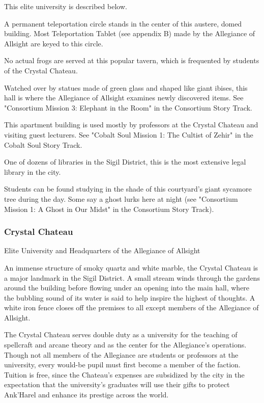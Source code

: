 \documentclass[10pt,a4paper,twoside,bg=print,twocolumn,openany,nodeprecatedcode]{dndbook}
\begin{document}
\begin{description}[nolistsep]
\item[S1: Crystal Chateau Entrance.]
This elite university is described below.
\item[S2: Teleportation Atrium.]
A permanent teleportation circle stands in the center of this austere, domed building. Most Teleportation Tablet (see appendix B) made by the Allegiance of Allsight are keyed to this circle.
\item[S3: The Frog and Kebab.]
No actual frogs are served at this popular tavern, which is frequented by students of the Crystal Chateau.
\item[S4: Emerald Ibis Relic Hall.]
Watched over by statues made of green glass and shaped like giant ibises, this hall is where the Allegiance of Allsight examines newly discovered items. See "Consortium Mission 3: Elephant in the Room" in the Consortium Story Track.
\item[S5: Scroll's Alcove.]
This apartment building is used mostly by professors at the Crystal Chateau and visiting guest lecturers. See "Cobalt Soul Mission 1: The Cultist of Zehir" in the Cobalt Soul Story Track.
\item[S6: Lawbearer's Librams.]
One of dozens of libraries in the Sigil District, this is the most extensive legal library in the city.
\item[S7: Boughs of the Wild Mother.]
Students can be found studying in the shade of this courtyard's giant sycamore tree during the day. Some say a ghost lurks here at night (see "Consortium Mission 1: A Ghost in Our Midst" in the Consortium Story Track).
\end{description}

\subsubsection{Crystal Chateau}
Elite University and Headquarters of the Allegiance of Allsight

An immense structure of smoky quartz and white marble, the Crystal Chateau is a major landmark in the Sigil District. A small stream winds through the gardens around the building before flowing under an opening into the main hall, where the bubbling sound of its water is said to help inspire the highest of thoughts. A white iron fence closes off the premises to all except members of the Allegiance of Allsight.

The Crystal Chateau serves double duty as a university for the teaching of spellcraft and arcane theory and as the center for the Allegiance's operations. Though not all members of the Allegiance are students or professors at the university, every would-be pupil must first become a member of the faction. Tuition is free, since the Chateau's expenses are subsidized by the city in the expectation that the university's graduates will use their gifts to protect Ank'Harel and enhance its prestige across the world.
\end{document}
